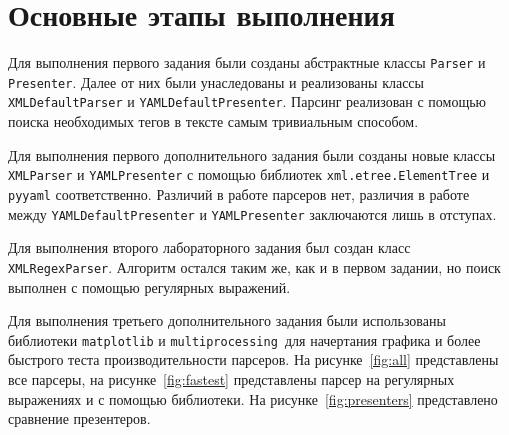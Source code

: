 \section{Основные этапы выполнения}
Для выполнения первого задания были созданы абстрактные классы \texttt{Parser} и \texttt{Presenter}.
Далее от них были унаследованы и реализованы классы \texttt{XMLDefaultParser} и \texttt{YAMLDefaultPresenter}.
Парсинг реализован с помощью поиска необходимых тегов в тексте самым тривиальным способом.

Для выполнения первого дополнительного задания были созданы новые классы \texttt{XMLParser} и \texttt{YAMLPresenter} с помощью
библиотек \texttt{xml.etree.ElementTree} и \texttt{pyyaml} соответственно.
Различий в работе парсеров нет, различия в работе между \texttt{YAMLDefaultPresenter} и \texttt{YAMLPresenter} заключаются лишь
в отступах.

Для выполнения второго лабораторного задания был создан класс \texttt{XMLRegexParser}.
Алгоритм остался таким же, как и в первом задании, но поиск выполнен с помощью регулярных выражений.

Для выполнения третьего дополнительного задания были использованы библиотеки \texttt{matplotlib} и \texttt{multiprocessing
}для начертания графика и более быстрого теста производительности парсеров. На рисунке~\ref{fig:all} представлены все парсеры,
на рисунке~\ref{fig:fastest} представлены парсер на регулярных выражениях и с помощью библиотеки.
На рисунке~\ref{fig:presenters} представлено сравнение презентеров.

